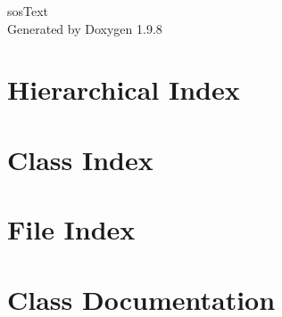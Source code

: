 \documentclass[twoside]{book}
\newcommand{\+}{\discretionary{\mbox{\scriptsize$\hookleftarrow$}}{}{}}
\newcommand{\clearemptydoublepage}{%
    \newpage{\pagestyle{empty}\cleardoublepage}%
  }
\begin{document}
  \raggedbottom
    \hypersetup{pageanchor=false,
                bookmarksnumbered=true,
                pdfencoding=unicode
               }
  \begin{titlepage}
  \vspace*{7cm}
  \begin{center}%
  {\Large sos\+Text}\\
  \vspace*{1cm}
  {\large Generated by Doxygen 1.9.8}\\
  \end{center}
  \end{titlepage}
  \clearemptydoublepage
  \tableofcontents
  \clearemptydoublepage
  \hypersetup{pageanchor=true}
\chapter{Hierarchical Index}

\chapter{Class Index}

\chapter{File Index}

\chapter{Class Documentation}












\end{document}
